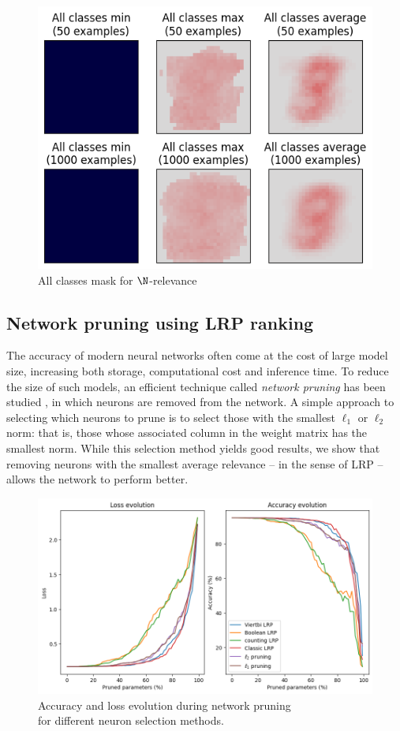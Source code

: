 \documentclass{../cs-classes/cs-classes}
\newcommand*{\1}{\digitsbb{1}}
\newcommand*{\0}{\digitsbb{0}}
\begin{document}
\begin{figure}[H]
    \centering
    \includegraphics[width=.5\textwidth]{counting-mask-all.png}
    \caption{All classes mask for $\N$-relevance}
\end{figure}

\subsection{Network pruning using LRP ranking}
The accuracy of modern neural networks often come at the cost of large model size, increasing both storage, computational cost and inference time. To reduce the size of such models, an efficient technique called \emph{network pruning} has been studied \cite{pruning-survey,new-pruning}, in which neurons are removed from the network. A simple approach to selecting which neurons to prune is to select those with the smallest $\ell_1$ or $\ell_2$ norm: that is, those whose associated column in the weight matrix has the smallest norm. While this selection method yields good results, we show that removing neurons with the smallest average relevance -- in the sense of LRP -- allows the network to perform better.
\begin{figure}[H]
    \centering
    \includegraphics[width=.7\textwidth]{pruning-graph-large.png}
    \caption{Accuracy and loss evolution during network pruning\\ for different neuron selection methods.}
    \label{fig:pruning-graph}
\end{figure}
\end{document}
